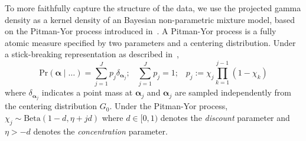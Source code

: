 To more faithfully capture the structure of the data, we use the projected gamma density 
    as a kernel density of an Bayesian non-parametric mixture model, based on 
    the Pitman-Yor process introduced in~\cite{perman1992}.  A Pitman-Yor process
    is a fully atomic measure specified by two parameters and a centering
    distribution.  Under a stick-breaking representation as described 
    in~\cite{ishwaran2001}, 
    \begin{equation}
        \label{eqn:stickbreak}
        \text{Pr}(\bm{\alpha}\mid\ldots) 
            = \sum_{j = 1}^Jp_j\delta_{\bm{\alpha}_j};\;\;\;
            \sum_{j=1}^Jp_j = 1;\;\;\;
            p_j := \chi_j\prod_{k = 1}^{j-1}(1 - \chi_k)
    \end{equation}
    where $\delta_{\bm{\alpha}_j}$ indicates a point mass at $\bm{\alpha}_j$ and
    $\bm{\alpha}_j$ are sampled independently from the centering distribution $G_0$.
    Under the Pitman-Yor process, $\chi_j \sim \text{Beta}(1 - d, \eta + jd)$
    where $d \in [0, 1)$ denotes the \emph{discount} parameter and $\eta > -d$
    denotes the \emph{concentration} parameter.

